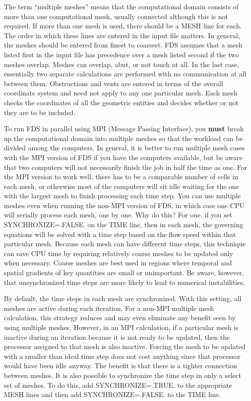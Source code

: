 \documentclass[11pt]{book}
\begin{document}
The term ``multiple meshes'' means that the computational domain consists of
more than one computational mesh, usually connected although this is not
required. If more than one mesh is used, there should be a
{\ct MESH} line for each. The order in which these
lines are entered in the input file matters. In general, the meshes should be entered
from finest to coarsest. FDS assumes that a mesh listed first in the input file has
precedence over a mesh listed second if the two meshes overlap.
Meshes can overlap, abut, or not touch at all. In the last case, essentially two separate
calculations are performed with no communication at all between them. Obstructions and vents are entered
in terms of the overall coordinate system and need not apply to any one particular mesh.
Each mesh checks the coordinates of all the geometric
entities and decides whether or not they are to be included.

To run FDS in parallel using MPI (Message Passing Interface), you {\bf must} break up the computational domain into multiple meshes so that the workload can be divided among the computers. In general, it is better to run multiple mesh cases with the MPI version of FDS if you have the computers available, but be aware that two computers will not necessarily finish the job in half the time as one. For the MPI version to work well, there has to be a comparable number of cells in each mesh, or otherwise most of the computers will sit idle waiting for the one with the largest mesh to finish processing each time step. You can use multiple meshes even when running the non-MPI version of FDS, in which case one CPU will serially process each mesh, one by one. Why do this? For one, if you set {\ct SYNCHRONIZE=.FALSE.} on the {\ct TIME} line, then in each mesh, the governing equations will be solved with a time step based on the flow speed within that particular mesh. Because each mesh can have different time steps, this technique can save CPU time by requiring relatively coarse meshes to be updated only when necessary. Coarse meshes are best used in regions where temporal and spatial gradients of key quantities are small or unimportant. Be aware, however, that unsynchronized time steps are more likely to lead to numerical instabilities.

By default, the time steps in each mesh are synchronized. With this setting, all meshes are active during each iteration. For a non-MPI multiple mesh calculation, this strategy reduces and may even eliminate any benefit seen by using multiple meshes. However, in an MPI calculation, if a particular mesh is inactive during an iteration because it is not ready to be updated, then the processor assigned to that mesh is also inactive. Forcing the mesh to be updated with a smaller than ideal time step does not cost anything since that processor would have been idle anyway. The benefit is that there is a tighter connection between meshes. It is also possible to synchronize the time step in only a select set of meshes. To do this, add {\ct SYNCHRONIZE=.TRUE.} to the appropriate {\ct MESH} lines and then add {\ct SYNCHRONIZE=.FALSE.} to the {\ct TIME} line.
\end{document}
